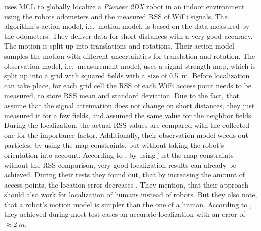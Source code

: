 \citet{siddiqi:experiments_mcl_wifi} uses \acs{MCL} to globally localize a \emph{Pioneer 2DX} robot in an indoor environment using the robots odometers and the measured \acs{RSS} of WiFi signals. The algorithm's action model, i.e.\ motion model, is based on the data measured by the odometers. They deliver data for short distances with a very good accuracy. The motion is split up into translations and rotations. Their action model samples the motion with different uncertainties for translation and rotation. The observation model, i.e.\ measurement model, uses a signal strength map, which is split up into a grid with squared fields with a size of 0.5~m. Before localization can take place, for each grid cell the \acs{RSS} of each WiFi access point needs to be measured, to store \acs{RSS} mean and standard deviation. Due to the fact, that \citet{siddiqi:experiments_mcl_wifi} assume that the signal attenuation does not change on short distances, they just measured it for a few fields, and assumed the same value for the neighbor fields. During the localization, the actual \acs{RSS} values are compared with the collected one for the importance factor. Additionally, their observation model weeds out particles, by using the map constraints, but without taking the robot's orientation into account. According to \citet{siddiqi:experiments_mcl_wifi}, by using just the map constraints without the \acs{RSS} comparison, very good localization results can already be achieved.
During their tests they found out, that by increasing the amount of access points, the location error decreases \citep{siddiqi:experiments_mcl_wifi}. They mention, that their approach should also work for localization of humans instead of robots. But they also note, that a robot's motion model is simpler than the one of a human. According to \citet{siddiqi:experiments_mcl_wifi}, they achieved during most test cases an accurate localization with an error of $\approx 2~m$.
